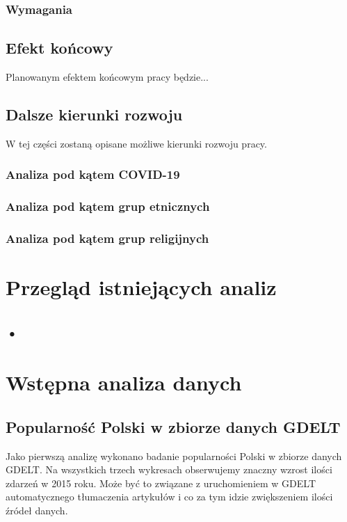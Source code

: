 \documentclass[11pt]{report}
\begin{document}
 \subsection{Wymagania}

 
 \section{Efekt końcowy}
 Planowanym efektem końcowym pracy będzie...
 
 \section{Dalsze kierunki rozwoju}
 W tej części zostaną opisane możliwe kierunki rozwoju pracy.
 \subsection{Analiza pod kątem COVID-19}
 \subsection{Analiza pod kątem grup etnicznych}
 \subsection{Analiza pod kątem grup religijnych}
 
 
 \chapter{Przegląd istniejących analiz}\label{ch:przeglad}
 \section{•}
  
 \chapter{Wstępna analiza danych}
 \section{Popularność Polski w zbiorze danych GDELT}
 Jako pierwszą analizę wykonano badanie popularności Polski w zbiorze danych GDELT. Na wszystkich trzech wykresach obserwujemy znaczny wzrost ilości zdarzeń w 2015 roku. Może być to związane z uruchomieniem w GDELT automatycznego tłumaczenia artykułów i co za tym idzie zwiększeniem ilości źródeł danych.
\end{document}

